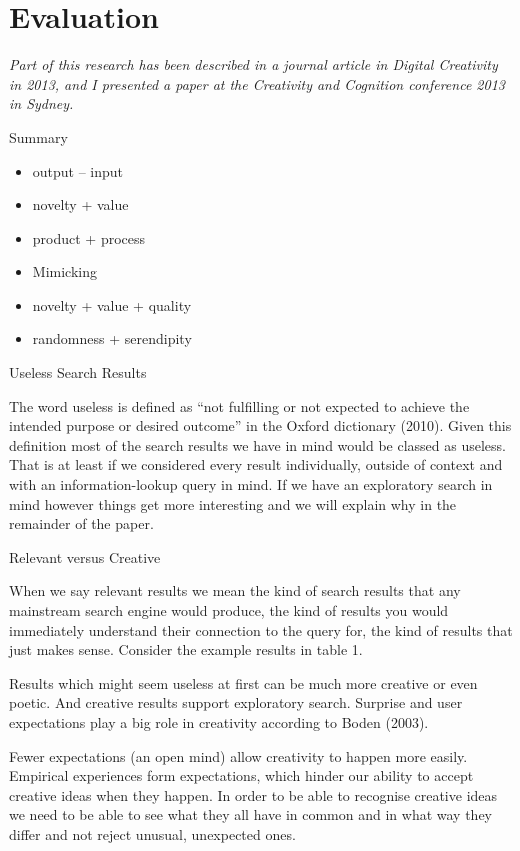 
\chapter{Evaluation}
\label{ch:evaluation}

\emph{Part of this research has been described in a journal article in Digital Creativity in 2013, and I presented a paper at the Creativity and Cognition conference 2013 in Sydney.}

\grule %

\begin{shaded}
  Summary
  \begin{itemize}
  \item output – input
  \item novelty + value
  \item product + process
  \item Mimicking
  \item novelty + value + quality
  \item randomness + serendipity
  \end{itemize}
\end{shaded}


Useless Search Results

The word useless is defined as ``not fulfilling or not expected to achieve the intended purpose or desired outcome'' in the Oxford dictionary (2010). Given this definition most of the search results we have in mind would be classed as useless. That is at least if we considered every result individually, outside of context and with an information-lookup query in mind. If we have an exploratory search in mind however things get more interesting and we will explain why in the remainder of the paper.

Relevant versus Creative

When we say relevant results we mean the kind of search results that any mainstream search engine would produce, the kind of results you would immediately understand their connection to the query for, the kind of results that just makes sense. Consider the example results in table 1.

Results which might seem useless at first can be much more creative or even poetic. And creative results support exploratory search. Surprise and user expectations play a big role in creativity according to Boden (2003).

Fewer expectations (an open mind) allow creativity to happen more easily. Empirical experiences form expectations, which hinder our ability to accept creative ideas when they happen. In order to be able to recognise creative ideas we need to be able to see what they all have in common and in what way they differ and not reject unusual, unexpected ones.

